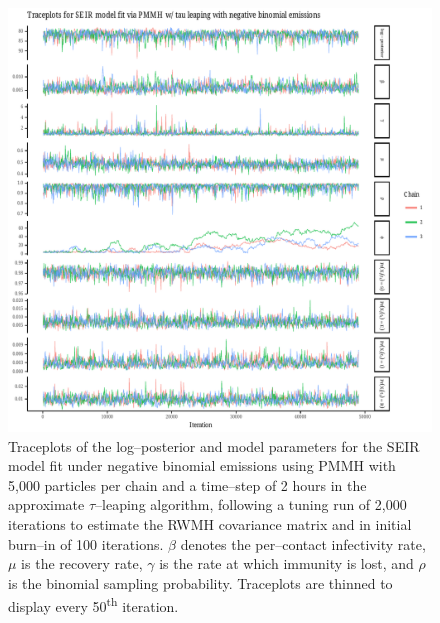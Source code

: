 \begin{figure}[htbp]
	\centering
	\includegraphics[width=\linewidth]{figures/bbs_seir_pmmh_negbinom_traceplots.pdf}
	\caption[Traceplots of SEIR model parameters fit to boarding school data using PMMH.]{Traceplots of the log--posterior and model parameters for the SEIR model fit under negative binomial emissions using PMMH with 5,000 particles per chain and a time--step of 2 hours in the approximate $ \tau $--leaping algorithm, following a tuning run of 2,000 iterations to estimate the RWMH covariance matrix and in initial burn--in of 100 iterations. $ \beta $ denotes the per--contact infectivity rate, $ \mu $ is the recovery rate, $ \gamma $ is the rate at which immunity is lost, and $ \rho $ is the binomial sampling probability. Traceplots are thinned to display every 50\textsuperscript{th} iteration.}
	\label{fig:bbs_seir_pmmh_negbinom_traceplots}
\end{figure}
